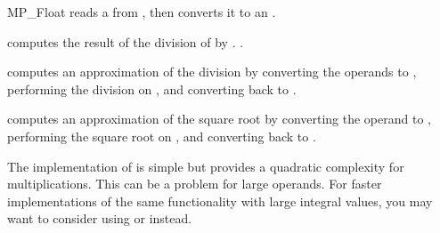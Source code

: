 \begin{ccRefClass} {MP_Float}
{reads a  from , then converts it to an .}

{computes the result of the division of  by .
.}

{computes an approximation of the division by converting the operands to
, performing the division on , and converting back to
.}

{computes an approximation of the square root by converting the operand to
, performing the square root on , and converting back
to .}


\ccImplementation 
The implementation of  is simple but provides a quadratic
complexity for multiplications.  This can be a problem for large operands.
For faster implementations of the same functionality with large integral
values, you may want to consider using  or  instead.

\end{ccRefClass} 
